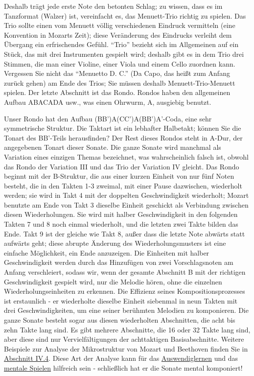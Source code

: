 Deshalb trägt jede erste Note den betonten Schlag; zu wissen, dass es im Tanzformat (Walzer) ist, vereinfacht es, das Menuett-Trio richtig zu spielen.
Das Trio sollte einen vom Menuett völlig verschiedenen Eindruck vermitteln (eine Konvention in Mozarts Zeit); diese Veränderung des Eindrucks verleiht dem Übergang ein erfrischendes Gefühl.
\enquote{Trio} bezieht sich im Allgemeinen auf ein Stück, das mit drei Instrumenten gespielt wird; deshalb gibt es in dem Trio drei Stimmen, die man einer Violine, einer Viola und einem Cello zuordnen kann.
Vergessen Sie nicht das \enquote{Menuetto D. C.} (Da Capo, das heißt zum Anfang zurück gehen) am Ende des Trios; Sie müssen deshalb Menuett-Trio-Menuett spielen.
Der letzte Abschnitt ist das Rondo.
Rondos haben den allgemeinen Aufbau ABACADA usw., was einen Ohrwurm, A, ausgiebig benutzt.


Unser Rondo hat den Aufbau (BB')A(CC')A(BB')A'-Coda, eine sehr symmetrische Struktur.
Die Taktart ist ein lebhafter Halbetakt; können Sie die Tonart des BB'-Teils herausfinden?
Der Rest dieses Rondos steht in A-Dur, der angegebenen Tonart dieser Sonate.
Die ganze Sonate wird manchmal als Variation eines einzigen Themas bezeichnet, was wahrscheinlich falsch ist, obwohl das Rondo 
der Variation III und das Trio der Variation IV gleicht.
Das Rondo beginnt mit der B-Struktur, die aus einer kurzen Einheit von nur fünf Noten besteht, die in den Takten 1-3 zweimal, mit einer Pause dazwischen, wiederholt werden; sie wird in Takt 4 mit der doppelten Geschwindigkeit wiederholt; Mozart benutzte am Ende von Takt 3 dieselbe Einheit geschickt als Verbindung zwischen diesen Wiederholungen.
Sie wird mit halber Geschwindigkeit in den folgenden Takten 7 und 8 noch einmal wiederholt, und die letzten zwei Takte bilden das Ende.
Takt 9 ist der gleiche wie Takt 8, außer dass die letzte Note abwärts statt aufwärts geht; diese abrupte Änderung des Wiederholungsmusters ist eine einfache Möglichkeit, ein Ende anzuzeigen.
Die Einheiten mit halber Geschwindigkeit werden durch das Hinzufügen von zwei Vorschlagsnoten am Anfang verschleiert, sodass wir, wenn der gesamte Abschnitt B mit der richtigen Geschwindigkeit gespielt wird, nur die Melodie hören, ohne die einzelnen Wiederholungseinheiten zu erkennen.
Die Effizienz seines Kompositionsprozesses ist erstaunlich - er wiederholte dieselbe Einheit siebenmal in neun Takten mit drei Geschwindigkeiten, um eine seiner berühmten Melodien zu komponieren.
Die ganze Sonate besteht sogar aus diesen wiederholten Abschnitten, die acht bis zehn Takte lang sind.
Es gibt mehrere Abschnitte, die 16 oder 32 Takte lang sind, aber diese sind nur Vervielfältigungen der achttaktigen Basisabschnitte.
Weitere Beispiele zur Analyse der Mikrostruktur von Mozart und Beethoven finden Sie in \hyperref[c1iv4]{Abschnitt IV.4}.
Diese Art der Analyse kann für das \hyperref[c1iii6]{Auswendiglernen} und das \hyperref[c1ii12mental]{mentale Spielen} hilfreich sein - schließlich hat er die Sonate mental komponiert!

